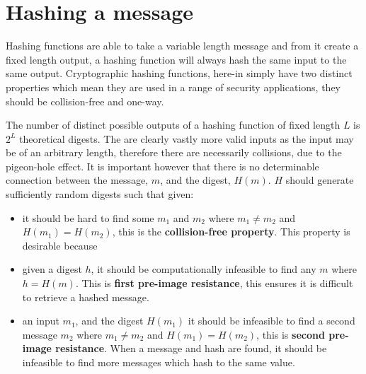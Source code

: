 \documentclass[a4paper,12pt]{article}
\title{}
\author{Jonathan Poulter}
\begin{document}
\maketitle

\begin{abstract}

\end{abstract}




\section{Hashing a message}
Hashing functions are able to take a variable length message and from it create a fixed length output, a hashing function will always hash the same input to the same output. Cryptographic hashing functions, here-in simply  have two distinct properties which mean they are used in a range of security applications, they should be collision-free and one-way.

 The number of distinct possible outputs of a hashing function of fixed length $L$ is $2^L$ theoretical digests. The are clearly vastly more valid inputs as the input may be of an arbitrary length, therefore there are necessarily collisions, due to the pigeon-hole effect. It is important however that there is no determinable connection between the message, $m$, and the digest, $H(m)$. $H$ should generate sufficiently random digests such that given:
\begin{itemize}
  \item it should be hard to find some $m_1$ and $m_2$ where $m_1 \neq m_2$ and $H(m_1) = H(m_2)$, this is the \textbf{collision-free property}. This property is desirable because
  \item given a digest $h$, it should be computationally infeasible to find any $m$ where $h = H(m)$. This is \textbf{first pre-image resistance}, this ensures it is difficult to retrieve a hashed message.
  \item  an input $m_1$, and the digest $H(m_1)$ it should be infeasible to find a second message $m_2$ where $m_1 \neq m_2$ and $H(m_1) = H(m_2)$, this is \textbf{second pre-image resistance}. When a message and hash are found, it should be infeasible to find more messages which hash to the same value.
\end{itemize}
\label{sec:propeties_of_a_hash}
\end{document}
